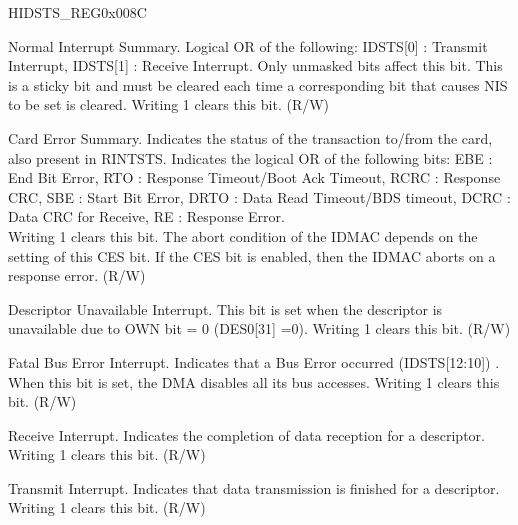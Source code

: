 \begin{register}{H}{IDSTS\_REG}{0x008C}
\begin{regdesc}
\begin{reglist}
\item [IDSTS\_NIS]Normal Interrupt Summary. Logical OR of the following: IDSTS[0] : Transmit Interrupt, IDSTS[1] : Receive Interrupt. Only unmasked bits affect this bit. This is a sticky bit and must be cleared each time a corresponding bit that causes NIS to be set is cleared. Writing 1 clears this bit. (R/W)
\item [IDSTS\_CES]Card Error Summary. Indicates the status of the transaction to/from the card, also present in RINTSTS. Indicates the logical OR of the following bits: EBE : End Bit Error, RTO : Response Timeout/Boot Ack Timeout, RCRC : Response CRC, SBE : Start Bit Error, DRTO : Data Read Timeout/BDS timeout, DCRC : Data CRC for Receive, RE : Response Error.\\
Writing 1 clears this bit. The abort condition of the IDMAC depends on the setting of this CES bit. If the CES bit is enabled, then the IDMAC aborts on a response error. (R/W)
\item [IDSTS\_DU]Descriptor Unavailable Interrupt. This bit is set when the descriptor is unavailable due to OWN bit = 0 (DES0[31] =0). Writing 1 clears this bit. (R/W)
\item [IDSTS\_FBE]Fatal Bus Error Interrupt. Indicates that a Bus Error occurred (IDSTS[12:10]) . When this bit is set, the DMA disables all its bus accesses. Writing 1 clears this bit. (R/W)
\item [IDSTS\_RI]Receive Interrupt. Indicates the completion of data reception for a descriptor. Writing 1 clears this bit. (R/W)
\item [IDSTS\_TI]Transmit Interrupt. Indicates that data transmission is finished for a descriptor. Writing 1 clears this bit. (R/W)
\end{reglist}\end{regdesc}
\end{register}


